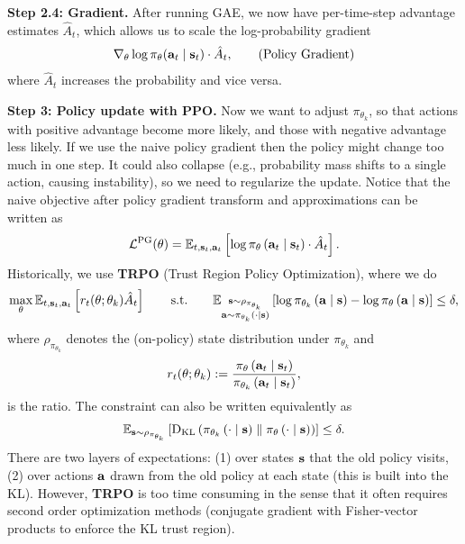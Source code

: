 \documentclass[11pt]{article}  %
\begin{document}
\textbf{Step 2.4: Gradient.} After running GAE, we now have per-time-step advantage estimates $\hat{A}_t$, which allows us to scale the log-probability gradient 
\begin{align}
  \label{eq:policy-grad}
  \nabla_{\theta} \log \pi_{\theta}(\mathbf{a}_t \mid \mathbf{s}_t) \cdot \hat{A}_t, \tag{Policy Gradient}
\end{align} 
where $\hat{A}_t$ increases the probability and vice versa.

\textbf{Step 3: Policy update with PPO.} Now we want to adjust $\pi_{\theta_k}$, so that actions with positive advantage become more likely, and those with negative advantage less likely.
If we use the naive policy gradient then the policy might change too much in one step.
It could also collapse (e.g., probability mass shifts to a single action, causing instability), so we need to regularize the update.
Notice that the naive objective after policy gradient transform and approximations can be written as 
\begin{align*}
  \mathcal{L}^{\text{PG}}(\theta) = \mathbb{E}_{t, \mathbf{s}_t, \mathbf{a}_t}\left[\log \pi_{\theta}\left( \mathbf{a}_t \mid \mathbf{s}_t \right)\cdot \hat{A}_t\right].
\end{align*}
Historically, we use \textbf{TRPO} (Trust Region Policy Optimization), where we do 
\begin{align*}
  \max_{\theta} \mathbb{E}_{t, \mathbf{s}_t, \mathbf{a}_t}\left[r_t(\theta; 
  \theta_k) \hat{A}_t\right] \qquad \text{s.t.} \qquad \mathbb{E}_{\substack{\mathbf{s} \sim \rho_{\pi_{\theta_{k}}} \\ \mathbf{a} \sim \pi_{\theta_{k}}\left( \cdot \mid \mathbf{s} \right)}}\left[\log\pi_{\theta_k}\left( \mathbf{a} \mid \mathbf{s} \right) - \log\pi_{\theta}\left( \mathbf{a} \mid \mathbf{s} \right)\right] \leq \delta,
\end{align*}
where $\rho_{\pi_{\theta_{k}}}$ denotes the (on-policy) state distribution under $\pi_{\theta_{k}}$ and 
\begin{align*}
  r_t(\theta; \theta_k) := \frac{\pi_{\theta}\left( \mathbf{a}_t \mid \mathbf{s}_t \right)}{\pi_{\theta_{k}}\left( \mathbf{a}_t \mid \mathbf{s}_t \right)},
\end{align*}
is the ratio.
The constraint can also be written equivalently as 
\begin{align*}
  \mathbb{E}_{\mathbf{s} \sim \rho_{\pi_{\theta_k}} }\left[{\rm D}_{\text{KL}}\left( \pi_{\theta_{k}}\left( \cdot \mid \mathbf{s} \right) \parallel \pi_{\theta}\left( \cdot \mid \mathbf{s} \right) \right)\right] \leq \delta.
\end{align*}
There are two layers of expectations: (1) over states $\mathbf{s}$ that the old policy visits, (2) over actions $\mathbf{a}$ drawn from the old policy at each state (this is built into the KL).
However, \textbf{TRPO} is too time consuming in the sense that it often requires second order optimization methods (conjugate gradient with Fisher-vector products to enforce the KL trust region).
\end{document}
